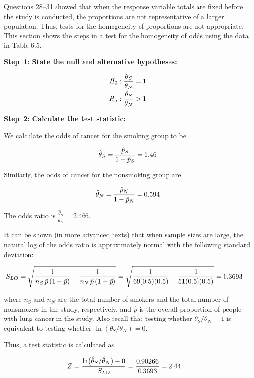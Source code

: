 \documentclass[
]{report}
\begin{document}
Questions 28--31 showed that when the response variable totals are fixed before the study is conducted, the proportions are not representative of a larger population. Thus, tests for the homogeneity of proportions are not appropriate. This section shows the steps in a test for the homogeneity of odds using the data in Table 6.5.

\textbf{Step~1: State the null and alternative hypotheses:}

\begin{align}
H_0: \frac{\theta_S}{\theta_N} &= 1 \notag \\ 
H_a: \frac{\theta_S}{\theta_N} &> 1 \notag
\end{align}

\textbf{Step~2: Calculate the test statistic:}

We calculate the odds of cancer for the smoking group to be

\begin{align}
\hat\theta_S = \frac{\hat p_S}{1 - \hat p_S} = 1.46 \notag
\end{align}

Similarly, the odds of cancer for the nonsmoking group are

\begin{align}
\hat\theta_N = \frac{\hat p_N}{1 - \hat p_N} = 0.594 \notag
\end{align}

The odds ratio is \(\frac{\hat\theta_S}{\hat\theta_N} = 2.466.\)

It can be shown (in more advanced texts) that when sample sizes are large, the natural log of the odds ratio is approximately normal with the following standard deviation:

\begin{align}
S_{LO} 
&= \sqrt{\frac{1}{n_S\,\hat p\,(1 - \hat p)} + \frac{1}{n_N\,\hat p\,(1 - \hat p)}} 
= \sqrt{\frac{1}{69(0.5)(0.5)} + \frac{1}{51(0.5)(0.5)}} = 0.3693
\notag
\end{align}

where \(n_S\) and \(n_N\) are the total number of smokers and the total number of nonsmokers in the study, respectively, and \(\hat p\) is the overall proportion of people with lung cancer in the study. Also recall that testing whether \(\theta_S/\theta_N = 1\) is equivalent to testing whether \(\ln(\theta_S/\theta_N) = 0\).

Thus, a test statistic is calculated as

\begin{align}
Z 
&= \frac{\ln\bigl(\hat\theta_S / \hat\theta_N\bigr) - 0}{S_{LO}}
= \frac{0.90266}{0.3693} = 2.44 \notag
\end{align}
\end{document}
